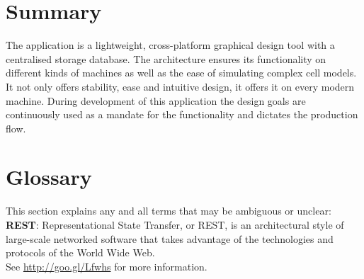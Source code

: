 \documentclass{report}
\begin{document}
	\section{Summary}
		The application is a lightweight, cross-platform graphical design tool with a centralised storage database. The architecture ensures its functionality on different kinds of machines as well as the ease of simulating complex cell models. It not only offers stability, ease and intuitive design, it offers it on every modern machine. During development of this application the design goals are continuously used as a mandate for the functionality and dictates the production flow.
	\section{Glossary}
		This section explains any and all terms that may be ambiguous or unclear:\\
		
		\textbf{REST}: Representational State Transfer, or REST, is an architectural style of large-scale networked software that takes advantage of the technologies and protocols of the World Wide Web. \\
See \href{http://goo.gl/Lfwhs}{http://goo.gl/Lfwhs} for more information.

\clearpage
\end{document}
